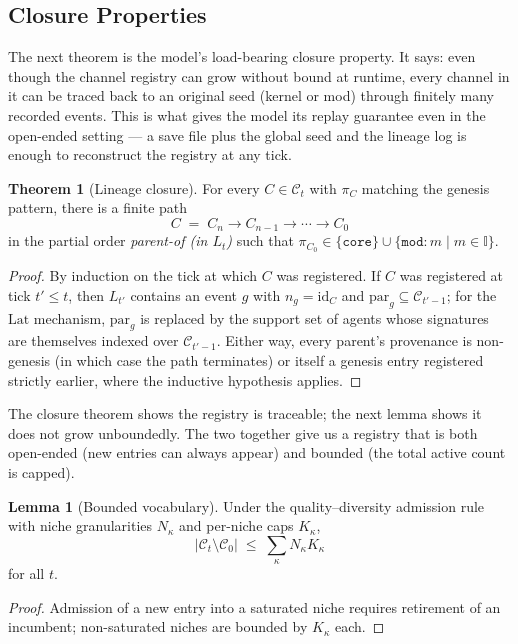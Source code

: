 \documentclass[journal,onecolumn,11pt]{IEEEtran}
\theoremstyle{definition}
\newtheorem{lemma}{Lemma}
\newtheorem{theorem}{Theorem}
\begin{document}
\subsection{Closure Properties}

The next theorem is the model's load-bearing closure property. It says: even though the channel registry can grow without bound at runtime, every channel in it can be traced back to an original seed (kernel or mod) through finitely many recorded events. This is what gives the model its replay guarantee even in the open-ended setting --- a save file plus the global seed and the lineage log is enough to reconstruct the registry at any tick.

\begin{theorem}[Lineage closure]\label{thm:lineage}
For every $C \in \mathcal{C}_t$ with $\pi_C$ matching the genesis pattern, there is a finite path
\[
C \;=\; C_n \to C_{n-1} \to \cdots \to C_0
\]
in the partial order \emph{parent-of (in $L_t$)} such that $\pi_{C_0} \in \{\mathtt{core}\} \cup \{\mathtt{mod}\!:\!m \mid m \in \mathbb{I}\}$.
\end{theorem}

\begin{proof}
By induction on the tick at which $C$ was registered. If $C$ was registered at tick $t' \le t$, then $L_{t'}$ contains an event $g$ with $n_g = \mathrm{id}_C$ and $\mathrm{par}_g \subseteq \mathcal{C}_{t'-1}$; for the $\mathrm{Lat}$ mechanism, $\mathrm{par}_g$ is replaced by the support set of agents whose signatures are themselves indexed over $\mathcal{C}_{t'-1}$. Either way, every parent's provenance is non-genesis (in which case the path terminates) or itself a genesis entry registered strictly earlier, where the inductive hypothesis applies.
\end{proof}

The closure theorem shows the registry is traceable; the next lemma shows it does not grow unboundedly. The two together give us a registry that is both open-ended (new entries can always appear) and bounded (the total active count is capped).

\begin{lemma}[Bounded vocabulary]\label{lem:bounded}
Under the quality--diversity admission rule with niche granularities $N_\kappa$ and per-niche caps $K_\kappa$,
\[
|\mathcal{C}_t \setminus \mathcal{C}_0| \;\le\; \sum_\kappa N_\kappa K_\kappa
\]
for all $t$.
\end{lemma}

\begin{proof}
Admission of a new entry into a saturated niche requires retirement of an incumbent; non-saturated niches are bounded by $K_\kappa$ each.
\end{proof}
\end{document}
